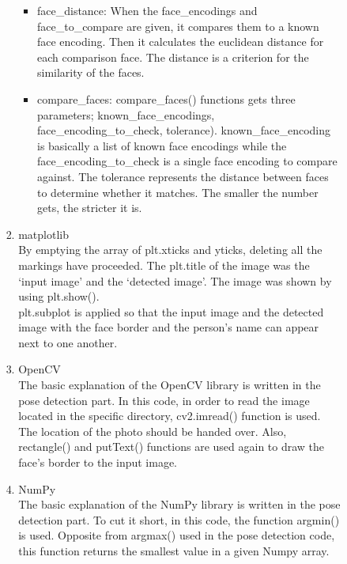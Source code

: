 \documentclass[conference]{IEEEtran}
\begin{document}
\begin{enumerate}[label=\arabic*.]
\begin{enumerate}[label=\arabic*.]
\begin{enumerate}[label=\alph*.]
\begin{enumerate}[label=\roman*.]
\begin{itemize}
                \item face\_distance: When the face\_encodings and face\_to\_compare are given, it compares them to a known face encoding. Then it calculates the euclidean distance for each comparison face. The distance is a criterion for the similarity of the faces. \\
                \item compare\_faces: compare\_faces() functions gets three parameters; known\_face\_encodings, face\_encoding\_to\_check, tolerance). known\_face\_encoding is basically a list of known face encodings while the face\_encoding\_to\_check is a single face encoding to compare against. The tolerance represents the distance between faces to determine whether it matches. The smaller the number gets, the stricter it is. \\
            \end{itemize}
            \item{\large{matplotlib}}\\
            By emptying the array of plt.xticks and yticks, deleting all the markings have proceeded. The plt.title of the image was the ‘input image’ and the ‘detected image’. The image was shown by using plt.show().\\
            plt.subplot is applied so that the input image and the detected image with the face border and the person’s name can appear next to one another. \\
            \item{\large{OpenCV}}\\
            The basic explanation of the OpenCV library is written in the pose detection part. In this code, in order to read the image located in the specific directory, cv2.imread() function is used. The location of the photo should be handed over. Also, rectangle() and putText() functions are used again to draw the face’s border to the input image. \\
            \item{\large{NumPy}}\\
            The basic explanation of the NumPy library is written in the pose detection part. To cut it short, in this code, the function argmin() is used. Opposite from argmax() used in the pose detection code,  this function returns the smallest value in a given Numpy array. \\

        \end{enumerate}
        

\end{enumerate}
\end{enumerate}
\end{enumerate}
\end{document}

